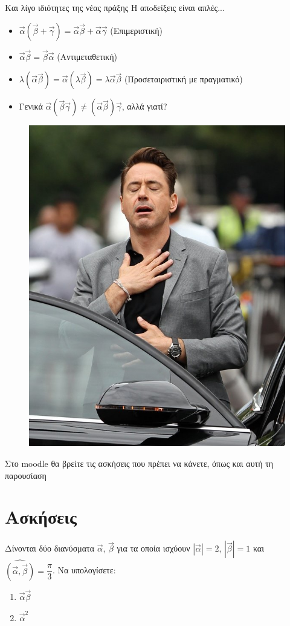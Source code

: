 \documentclass[greek]{beamer}
\begin{document}
\begin{frame}{Και λίγο ιδιότητες της νέας πράξης}
  Η απoδείξεις είναι απλές...
  \begin{itemize}
    \item<1-> $\vec{α}(\vec{β}+\vec{γ})=\vec{α}\vec{β}+\vec{α}\vec{γ}$ (Επιμεριστική)
    \item<2-> $\vec{α}\vec{β}=\vec{β}\vec{α}$ (Αντιμεταθετική)
    \item<3-> $λ(\vec{α}\vec{β})=\vec{α}(λ\vec{β})=λ\vec{α}\vec{β}$ (Προσεταιριστική με πραγματικό)
    \item<4-> Γενικά $\vec{α}(\vec{β}\vec{γ})\ne (\vec{α}\vec{β})\vec{γ}$, αλλά γιατί?
  \end{itemize}
\end{frame}

\begin{frame}
  \begin{figure}
    \centering
    \includegraphics[width=0.5 \textwidth]{"../images/relief"}
  \end{figure}
\end{frame}

\begin{frame}
  Στο moodle θα βρείτε τις ασκήσεις που πρέπει να κάνετε, όπως και αυτή τη παρουσίαση
\end{frame}

\section{Ασκήσεις}

\begin{askisi}
  Δίνονται δύο διανύσματα $\vec{α}$, $\vec{β}$ για τα οποία ισχύουν $|\vec{α}|=2$, $|\vec{β}|=1$ και $\widehat{(\vec{α }, \vec{β })}=\dfrac{\pi}{3}$. Να υπολογίσετε:
  \begin{enumerate}
    \item<1-> $\vec{α}\vec{β}$
    \item<2-> $\vec{α}^2$
  \end{enumerate}

\end{askisi}
\end{document}
